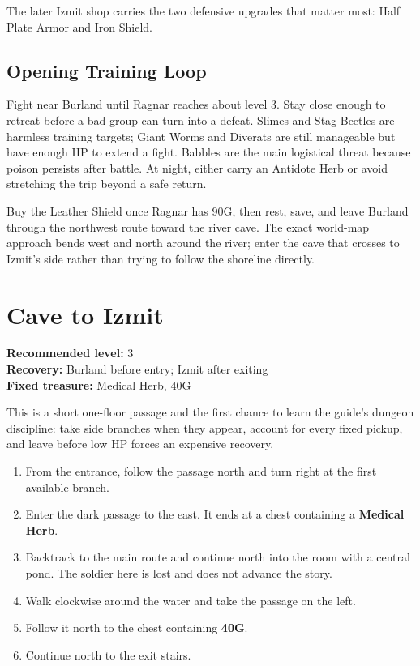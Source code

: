\documentclass[
  american,
  10pt,
  letterpaper,
  oneside,
  open=any]{scrreprt}
\providecommand{\tightlist}{%
  \setlength{\itemsep}{0pt}\setlength{\parskip}{0pt}}
\begin{document}
The later Izmit shop carries the two defensive upgrades that matter
most: Half Plate Armor and Iron Shield.

\subsection{Opening Training Loop}\label{opening-training-loop}

Fight near Burland until Ragnar reaches about level 3. Stay close enough
to retreat before a bad group can turn into a defeat. Slimes and Stag
Beetles are harmless training targets; Giant Worms and Diverats are
still manageable but have enough HP to extend a fight. Babbles are the
main logistical threat because poison persists after battle. At night,
either carry an Antidote Herb or avoid stretching the trip beyond a safe
return.

Buy the Leather Shield once Ragnar has 90G, then rest, save, and leave
Burland through the northwest route toward the river cave. The exact
world-map approach bends west and north around the river; enter the cave
that crosses to Izmit's side rather than trying to follow the shoreline
directly.

\section{Cave to Izmit}\label{cave-to-izmit}

\textbf{Recommended level:} 3\\
\textbf{Recovery:} Burland before entry; Izmit after exiting\\
\textbf{Fixed treasure:} Medical Herb, 40G

This is a short one-floor passage and the first chance to learn the
guide's dungeon discipline: take side branches when they appear, account
for every fixed pickup, and leave before low HP forces an expensive
recovery.

\begin{enumerate}
\def\labelenumi{\arabic{enumi}.}
\tightlist
\item
  From the entrance, follow the passage north and turn right at the
  first available branch.
\item
  Enter the dark passage to the east. It ends at a chest containing a
  \textbf{Medical Herb}.
\item
  Backtrack to the main route and continue north into the room with a
  central pond. The soldier here is lost and does not advance the story.
\item
  Walk clockwise around the water and take the passage on the left.
\item
  Follow it north to the chest containing \textbf{40G}.
\item
  Continue north to the exit stairs.
\end{enumerate}
\end{document}
